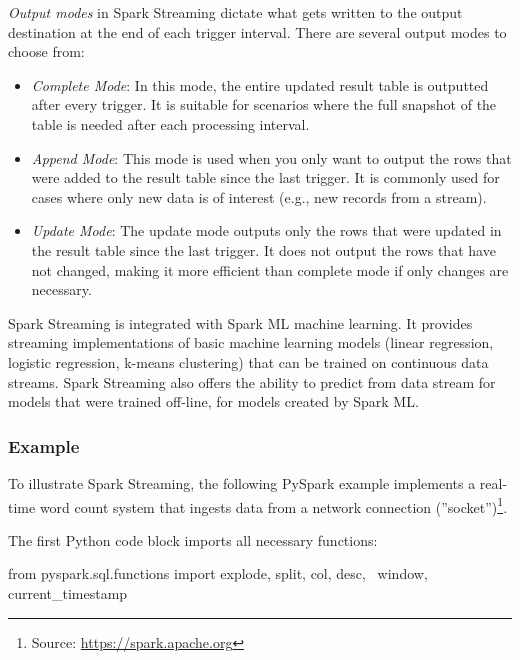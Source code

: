 \emph{Output modes} in Spark Streaming dictate what gets written to the output destination at the end of each trigger interval. There are several output modes to choose from:

\begin{itemize}
\item \emph{Complete Mode}: In this mode, the entire updated result table is outputted after every trigger. It is suitable for scenarios where the full snapshot of the table is needed after each processing interval.

\item \emph{Append Mode}: This mode is used when you only want to output the rows that were added to the result table since the last trigger. It is commonly used for cases where only new data is of interest (e.g., new records from a stream).

\item \emph{Update Mode}: The update mode outputs only the rows that were updated in the result table since the last trigger. It does not output the rows that have not changed, making it more efficient than complete mode if only changes are necessary.
\end{itemize}

Spark Streaming is integrated with Spark ML machine learning. It provides streaming implementations of basic machine learning models (linear regression, logistic regression, k-means clustering) that can be trained on continuous data streams. Spark Streaming also offers the ability to predict from data stream for models that were trained off-line, for models created by Spark ML.

\subsubsection*{Example}

To illustrate Spark Streaming, the following PySpark example implements a real-time word count system that ingests data from a network connection (''socket'')\footnote{Source: \url{https://spark.apache.org}}.

The first Python code block imports all necessary functions:

\begin{samepage}
\begin{pythoncode}
from pyspark.sql.functions import explode, split, col, desc, \
    window, current_timestamp
\end{pythoncode}
\end{samepage}

